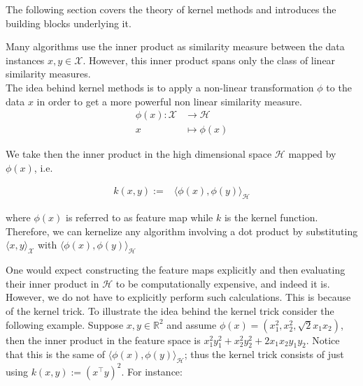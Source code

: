 The following section covers the theory of kernel methods and introduces the building blocks underlying it.


Many algorithms use the inner product as similarity measure between the data instances $x, y \in \mathcal{X}$. However, this inner product spans only the class of linear similarity measures. 
\\
The idea behind kernel methods is to apply a non-linear transformation $\phi$ to the data $x$ 
in order to get a more powerful non linear similarity measure.
\begin{align*}
\phi(x)\colon \mathcal{X} &\to \mathcal{H}
    \\
    x&\mapsto \phi(x)
\end{align*}

We take then the inner product in the high dimensional space $\mathcal{H}$ mapped by $\phi(x)$, i.e.\

\begin{align*}
k(x,y):=&\langle \phi(x), \phi(y) \rangle_{\mathcal{H}}
\end{align*}

where $\phi(x)$ is referred to as feature map while $k$ is the kernel function.
Therefore, we can kernelize any algorithm involving a dot product by substituting $\langle x, y \rangle_{\mathcal{X}}$ with $\langle \phi(x), \phi(y) \rangle_{\mathcal{H}}$

One would expect constructing the feature maps explicitly and then evaluating their inner product in $\mathcal{H}$ to be computationally expensive, and indeed it is. However, we do not have to explicitly perform such calculations. This is because of the kernel trick.
To illustrate the idea behind the kernel trick consider the following example.
Suppose $x, y \in \mathbb{R}^2$ and assume $\phi(x)=(x_{1}^{2},x_{2}^{2},\sqrt{2}x_{1}x_{2})$, then the inner product in the feature space is $x_{1}^{2}y_{1}^{2}+x_{2}^{2}y_{2}^{2}+2x_{1}x_{2}y_{1}y_{2}$.
Notice that this is the same of $\langle \phi(x), \phi(y) \rangle_{\mathcal{H}}$; thus the kernel trick consists of just using $k(x,y):=(x^\intercal y)^2$.
For instance:

